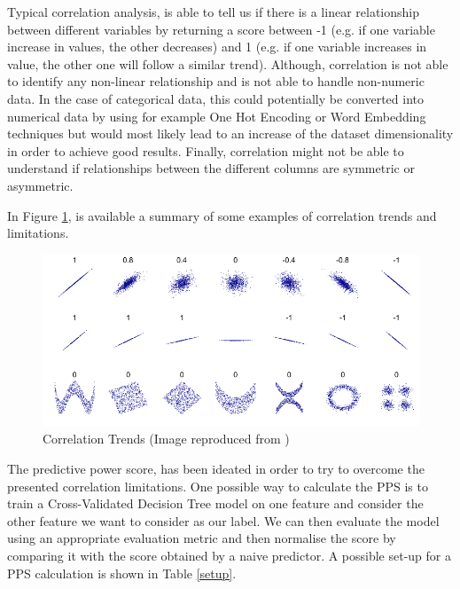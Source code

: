 Typical correlation analysis, is able to tell us if there is a linear relationship between different variables by returning a score between -1 (e.g. if one variable increase in values, the other decreases) and 1 (e.g. if one variable increases in value, the other one will follow a similar trend). Although, correlation is not able to identify any non-linear relationship and is not able to handle non-numeric data. In the case of categorical data, this could potentially be converted into numerical data by using for example One Hot Encoding or Word Embedding techniques but would most likely lead to an increase of the dataset dimensionality in order to achieve good results. Finally, correlation might not be able to understand if relationships between the different columns are symmetric or asymmetric.

In Figure \ref{corr_t}, is available a summary of some examples of correlation trends and limitations.

\vspace{-0.1cm}
\begin{figure}[ht!]%
    \centering
    \includegraphics[width=0.85\linewidth]{latex/images/corr.pdf}
    \vspace{-0.2cm}
    \caption{Correlation Trends (Image reproduced from \cite{corr_trends})}
    \label{corr_t}
\end{figure}
\vspace{-0.5cm}

The predictive power score, has been ideated in order to try to overcome the presented correlation limitations. One possible way to calculate the PPS is to train a Cross-Validated Decision Tree model on one feature and consider the other feature we want to consider as our label. We can then evaluate the model using an appropriate evaluation metric and then normalise the score by comparing it with the score obtained by a naive predictor. A possible set-up for a PPS calculation is shown in Table \ref{setup}.

